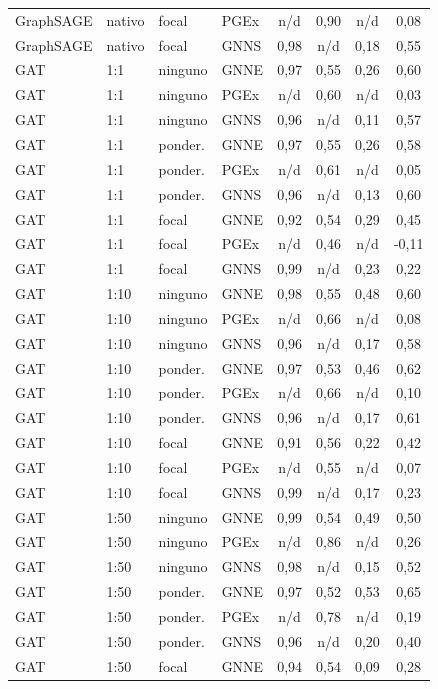 \begin{longtable}{llll cccc}
GraphSAGE & nativo & focal & PGEx & n/d & 0,90 & n/d & 0,08 \\
GraphSAGE & nativo & focal & GNNS & 0,98 & n/d & 0,18 & 0,55 \\
GAT & 1:1 & ninguno & GNNE & 0,97 & 0,55 & 0,26 & 0,60 \\
GAT & 1:1 & ninguno & PGEx & n/d & 0,60 & n/d & 0,03 \\
GAT & 1:1 & ninguno & GNNS & 0,96 & n/d & 0,11 & 0,57 \\
GAT & 1:1 & ponder. & GNNE & 0,97 & 0,55 & 0,26 & 0,58 \\
GAT & 1:1 & ponder. & PGEx & n/d & 0,61 & n/d & 0,05 \\
GAT & 1:1 & ponder. & GNNS & 0,96 & n/d & 0,13 & 0,60 \\
GAT & 1:1 & focal & GNNE & 0,92 & 0,54 & 0,29 & 0,45 \\
GAT & 1:1 & focal & PGEx & n/d & 0,46 & n/d & -0,11 \\
GAT & 1:1 & focal & GNNS & 0,99 & n/d & 0,23 & 0,22 \\
GAT & 1:10 & ninguno & GNNE & 0,98 & 0,55 & 0,48 & 0,60 \\
GAT & 1:10 & ninguno & PGEx & n/d & 0,66 & n/d & 0,08 \\
GAT & 1:10 & ninguno & GNNS & 0,96 & n/d & 0,17 & 0,58 \\
GAT & 1:10 & ponder. & GNNE & 0,97 & 0,53 & 0,46 & 0,62 \\
GAT & 1:10 & ponder. & PGEx & n/d & 0,66 & n/d & 0,10 \\
GAT & 1:10 & ponder. & GNNS & 0,96 & n/d & 0,17 & 0,61 \\
GAT & 1:10 & focal & GNNE & 0,91 & 0,56 & 0,22 & 0,42 \\
GAT & 1:10 & focal & PGEx & n/d & 0,55 & n/d & 0,07 \\
GAT & 1:10 & focal & GNNS & 0,99 & n/d & 0,17 & 0,23 \\
GAT & 1:50 & ninguno & GNNE & 0,99 & 0,54 & 0,49 & 0,50 \\
GAT & 1:50 & ninguno & PGEx & n/d & 0,86 & n/d & 0,26 \\
GAT & 1:50 & ninguno & GNNS & 0,98 & n/d & 0,15 & 0,52 \\
GAT & 1:50 & ponder. & GNNE & 0,97 & 0,52 & 0,53 & 0,65 \\
GAT & 1:50 & ponder. & PGEx & n/d & 0,78 & n/d & 0,19 \\
GAT & 1:50 & ponder. & GNNS & 0,96 & n/d & 0,20 & 0,40 \\
GAT & 1:50 & focal & GNNE & 0,94 & 0,54 & 0,09 & 0,28 \\

\end{longtable}
